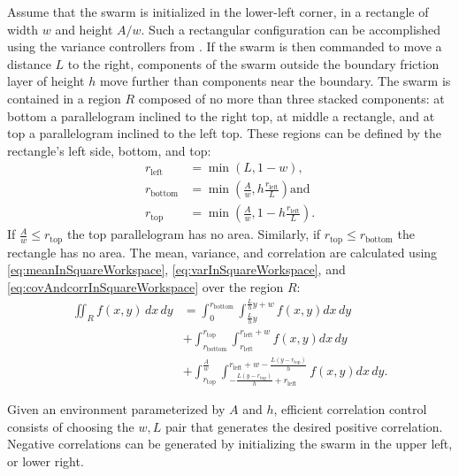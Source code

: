  Assume that the swarm is initialized in the lower-left corner, in a rectangle of width $w$ and height $A/w$. 
 Such a rectangular configuration can be accomplished using the variance controllers from \cite{ShahrokhiIROS2015}. 
  If the swarm is then commanded to move a distance $L$ to the right, components of the swarm outside the boundary friction layer of height $h$ move further than components near the boundary. 
   The swarm is contained in a region $R$ composed of no more than three stacked components: at bottom a parallelogram inclined to the right top, at middle a rectangle, and at top a parallelogram inclined to the left top. These regions can be defined by the rectangle's left side, bottom, and top:
\begin{align}
r_{\text{left}} &= \min \left(L,1-w \right),\nonumber \\
r_{\text{bottom}} &=\min \left(\frac{A}{w}, h\frac{r_{\textrm{left}}}{L}  \right) \text{and}\nonumber \\
r_{\text{top}}  &= \min \left(\frac{A}{w}, 1-h\frac{r_{\text{left}}}{L}  \right).
\end{align}
If $\frac{A}{w} \le r_{\text{top}}$ the top parallelogram has no area. 
 Similarly, if $r_{\text{top}} \le r_{\text{bottom}}$ the rectangle has no area. 
The mean, variance, and correlation are calculated  using \eqref{eq:meanInSquareWorkspace}, \eqref{eq:varInSquareWorkspace}, and \eqref{eq:covAndcorrInSquareWorkspace} over the region $R$:
\begin{align} \iint_R f(x,y) \, dx \,dy &=  \int_0^{r_{\text{bottom}}}  \int_{\frac{L}{h}y}^{\frac{L}{h}y+w}  f(x,y)  dx \, dy \label{eq:correlationFriction} \\
&+\int_{r_{\text{bottom}}}^{r_{\text{top}}} \int_{r_{\text{left}}}^{r_{\text{left}} +w} f(x,y)    dx \, dy \nonumber\\
&+\int_{r_{\text{top}}}^{\frac{A}{w}} \int_{-\frac{L (y-r_{\text{top}})}{h}+r_{\text{left}}}^{r_{\text{left}}+w-\frac{L (y-r_{\text{top}})}{h}} f(x,y)   dx \, dy .\nonumber
\end{align}
 
 Given an environment parameterized by $A$ and $h$, efficient correlation control consists of choosing the $w,L$ pair  that generates the desired positive correlation.
  Negative correlations can be generated by initializing the swarm in the upper left, or lower right.

